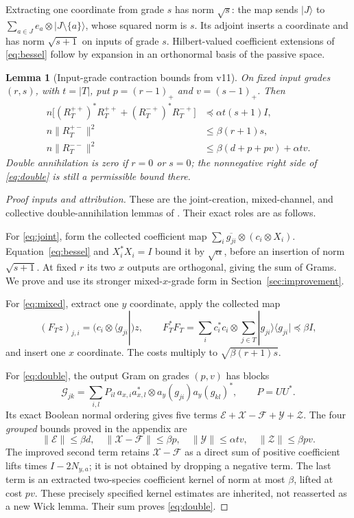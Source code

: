 \documentclass[11pt]{article}
\numberwithin{equation}{section}
\newtheorem{lemma}[theorem]{Lemma}
\theoremstyle{definition}\newtheorem{definition}[theorem]{Definition}
\theoremstyle{remark}\newtheorem{remark}[theorem]{Remark}
\newcommand{\norm}[1]{\lVert#1\rVert}\newcommand{\ip}[2]{\langle#1,#2\rangle}
\begin{document}
Extracting one coordinate from grade $s$ has norm $\sqrt s$: the map sends $|J\rangle$ to $\sum_{a\in J}e_a\otimes|J\setminus\{a\}\rangle$, whose squared norm is $s$. Its adjoint inserts a coordinate and has norm $\sqrt{s+1}$ on inputs of grade $s$. Hilbert-valued coefficient extensions of \eqref{eq:bessel} follow by expansion in an orthonormal basis of the passive space.

\begin{lemma}[Input-grade contraction bounds from v11]
\label{lem:inherited}
On fixed input grades $(r,s)$, with $t=|T|$, put $p=(r-1)_+$ and $v=(s-1)_+$. Then
\begin{align}
 n\big[(R_T^{++})^*R_T^{++}+(R_T^{-+})^*R_T^{-+}\big]
    &\preceq\alpha t(s+1)I,\label{eq:joint}\\
 n\norm{R_T^{+-}}^2&\le\beta(r+1)s,\label{eq:mixed}\\
 n\norm{R_T^{--}}^2&\le\beta(d+p+pv)+\alpha tv.
 \label{eq:double}
\end{align}
Double annihilation is zero if $r=0$ or $s=0$; the nonnegative right side of \eqref{eq:double} is still a permissible bound there.
\end{lemma}
\begin{proof}[Proof inputs and attribution]
These are the joint-creation, mixed-channel, and collective double-annihilation lemmas of \cite[coefficient-map section and coefficient-kernel appendix]{Framework}. Their exact roles are as follows.

For \eqref{eq:joint}, form the collected coefficient map $\sum_i\overline{g_{ji}}\otimes(c_i\otimes X_i)$. Equation~\eqref{eq:bessel} and $X_i^*X_i=I$ bound it by $\sqrt\alpha$, before an insertion of norm $\sqrt{s+1}$. At fixed $r$ its two $x$ outputs are orthogonal, giving the sum of Grams. We prove and use its stronger mixed-$x$-grade form in Section~\ref{sec:improvement}.

For \eqref{eq:mixed}, extract one $y$ coordinate, apply the collected map
\[
 (F_Tz)_{j,i}=(c_i\otimes\langle g_{ji}|)z,
 \qquad F_T^*F_T
 =\sum_i c_i^*c_i\otimes\sum_{j\in T}|g_{ji}\rangle\langle g_{ji}|
 \preceq\beta I,
\]
and insert one $x$ coordinate. The costs multiply to $\sqrt{\beta(r+1)s}$.

For \eqref{eq:double}, the output Gram on grades $(p,v)$ has blocks
\[
 \mathcal G_{jk}=\sum_{i,l}P_{il}\,
       a_{x,i}a_{x,l}^*\otimes a_y(g_{ji})a_y(g_{kl})^*,
 \qquad P=UU^*.
\]
Its exact Boolean normal ordering gives five terms $\mathcal E+\mathcal X-\mathcal F+\mathcal Y+\mathcal Z$. The four \emph{grouped} bounds proved in the appendix are
\[
 \norm{\mathcal E}\le\beta d,\quad
 \norm{\mathcal X-\mathcal F}\le\beta p,\quad
 \norm{\mathcal Y}\le\alpha tv,\quad
 \norm{\mathcal Z}\le\beta pv.
\]
The improved second term retains $\mathcal X-\mathcal F$ as a direct sum of positive coefficient lifts times $I-2N_{y,a}$; it is not obtained by dropping a negative term. The last term is an extracted two-species coefficient kernel of norm at most $\beta$, lifted at cost $pv$. These precisely specified kernel estimates are inherited, not reasserted as a new Wick lemma. Their sum proves \eqref{eq:double}.
\end{proof}
\end{document}
